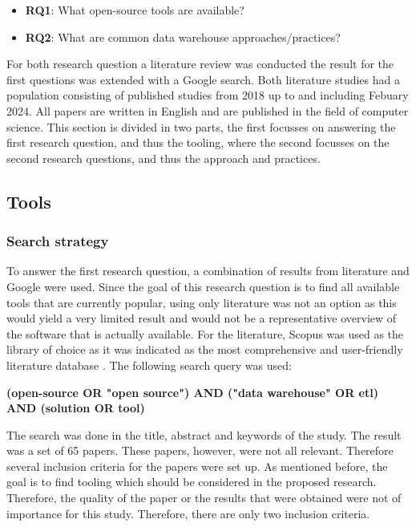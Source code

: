 \documentclass[11pt]{article}
\begin{document}
\begin{itemize}
    \item \textbf{RQ1}: What open-source tools are available?
    \item \textbf{RQ2}: What are common data warehouse approaches/practices?
\end{itemize}

For both research question a literature review was conducted the result for the first questions was extended with a Google search. Both literature studies had a population consisting of published studies from 2018 up to and including Febuary 2024. All papers are written in English and are published in the field of computer science. This section is divided in two parts, the first focusses on answering the first research question, and thus the tooling, where the second focusses on the second research questions, and thus the approach and practices.

\subsection{Tools}
\subsubsection{Search strategy}
To answer the first research question, a combination of results from literature and Google were used. Since the goal of this research question is to find all available tools that are currently popular, using only literature was not an option as this would yield a very limited result and would not be a representative overview of the software that is actually available. For the literature, Scopus was used as the library of choice as it was indicated as the most comprehensive and user-friendly literature database \cite{harzing2016google, mongeon2016journal}. The following search query was used:

\textbf{(open-source OR "open source") AND ("data warehouse" OR etl) AND (solution OR tool)}

The search was done in the title, abstract and keywords of the study. The result was a set of 65 papers. These papers, however, were not all relevant. Therefore several inclusion criteria for the papers were set up. As mentioned before, the goal is to find tooling which should be considered in the proposed research. Therefore, the quality of the paper or the results that were obtained were not of importance for this study. Therefore, there are only two inclusion criteria.
\end{document}
